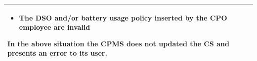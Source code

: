 \documentclass[11pt]{article}
\begin{document}
\begin{description}
\begin{table}[H]
\begin{tabularx}{\textwidth}{|>{\hsize=0.5\hsize}X|>{\hsize=1.5\hsize}X|}
\begin{minipage}[t]{\hsize}
                \vspace{0pt}
                \begin{itemize}[topsep=0pt, leftmargin=*]
                    \item The DSO and/or battery usage policy inserted by the CPO employee are invalid
                \end{itemize}
                \vspace{8pt}
                \end{minipage}
                In the above situation the CPMS does not updated the CS and presents an error to its user.
                \vspace{6pt}
            \\
            \hline
        \end{tabularx}
    \end{table}
    

\end{description}
\end{document}
